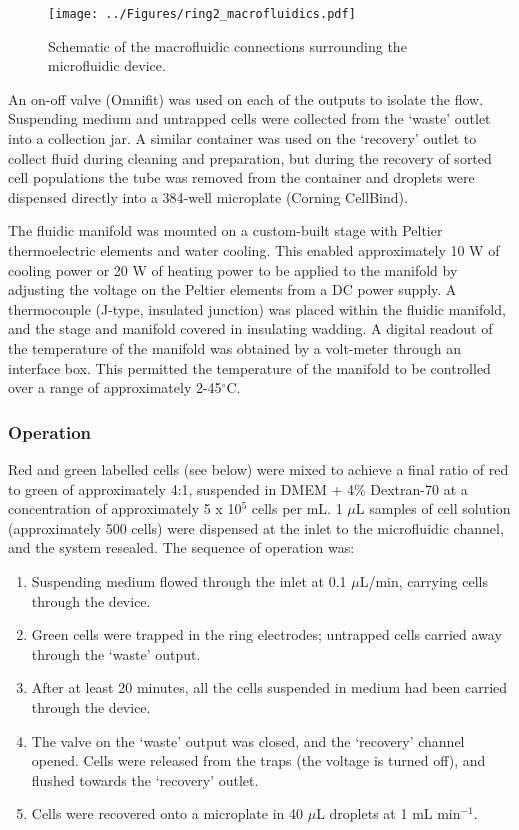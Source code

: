 \begin{figure}
	\centering
		\texttt{[image: ../Figures/ring2\_macrofluidics.pdf]}
	\caption{Schematic of the macrofluidic connections surrounding the microfluidic device.}
	\label{fig:ring2_macrofluidics}
\end{figure}

An on-off valve (Omnifit) was used on each of the outputs to isolate the flow. Suspending medium and untrapped cells were collected from the `waste' outlet into a collection jar. A similar container was used on the `recovery' outlet to collect fluid during cleaning and preparation, but during the recovery of sorted cell populations the tube was removed from the container and droplets were dispensed directly into a 384-well microplate (Corning CellBind).

The fluidic manifold was mounted on a custom-built stage with Peltier thermoelectric elements and water cooling. This enabled approximately 10 W of cooling power or 20 W of heating power to be applied to the manifold by adjusting the voltage on the Peltier elements from a DC power supply. A thermocouple (J-type, insulated junction) was placed within the fluidic manifold, and the stage and manifold covered in insulating wadding. A digital readout of the temperature of the manifold was obtained by a volt-meter through an interface box. This permitted the temperature of the manifold to be controlled over a range of approximately 2-45$^\circ$C.

\subsubsection{Operation}
Red and green labelled cells (see below) were mixed to achieve a final ratio of red to green of approximately 4:1, suspended in DMEM + 4\% Dextran-70 at a concentration of approximately 5 x 10$^{5}$ cells per mL. 1 $\mu$L samples of cell solution (approximately 500 cells) were dispensed at the inlet to the microfluidic channel, and the system resealed. The sequence of operation was:
\begin{enumerate}
	\item Suspending medium flowed through the inlet at 0.1 $\mu$L/min, carrying cells through the device.
	\item Green cells were trapped in the ring electrodes; untrapped cells carried away through the `waste' output.
	\item After at least 20 minutes, all the cells suspended in medium had been carried through the device.
	\item The valve on the `waste' output was closed, and the `recovery' channel opened. Cells were released from the traps (the voltage is turned off), and flushed towards the `recovery' outlet.
	\item Cells were recovered onto a microplate in 40 $\mu$L droplets at 1 mL min$^{-1}$. 
\end{enumerate}

